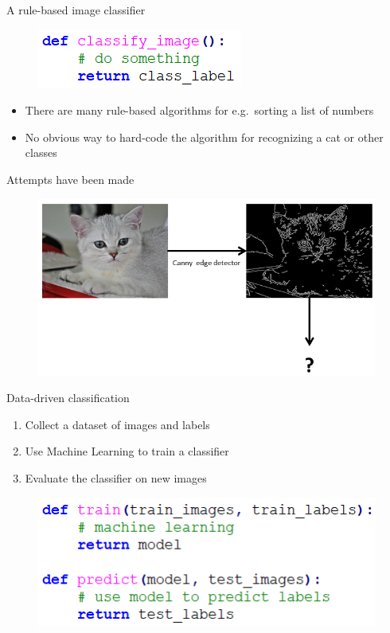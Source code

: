 \documentclass[dvipsnames]{beamer}
\def\eg{e.g.\ }
\begin{document}
\begin{frame}{A rule-based image classifier}
\begin{figure}
\includegraphics[scale=.7]{figures/rule_based.png}
\end{figure}
\begin{itemize}
	\item There are many rule-based algorithms for \eg sorting a list of numbers
	\item No obvious way to hard-code the algorithm for recognizing a cat or other classes
\end{itemize}

\end{frame}

\begin{frame}{Attempts have been made}
\begin{figure}
\includegraphics[scale=.6]{figures/canny.png}
\end{figure}
\end{frame}
\note{}

\begin{frame}{Data-driven classification}
\begin{enumerate}
	\item Collect a dataset of images and labels
	\item Use Machine Learning to train a classifier
	\item Evaluate the classifier on new images
\end{enumerate}
\begin{figure}
\includegraphics[scale=.7]{figures/ml_func.png}
\end{figure}
\end{frame}
\end{document}
